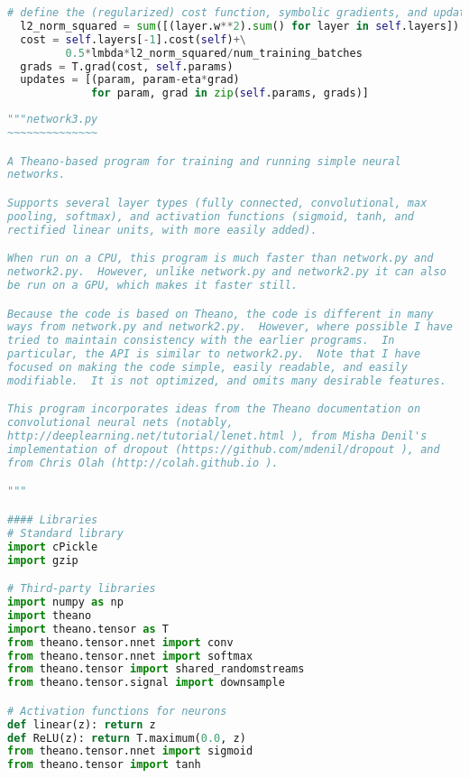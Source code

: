 \begin{lstlisting}[language=Python]
  # define the (regularized) cost function, symbolic gradients, and updates
  l2_norm_squared = sum([(layer.w**2).sum() for layer in self.layers])
  cost = self.layers[-1].cost(self)+\
         0.5*lmbda*l2_norm_squared/num_training_batches
  grads = T.grad(cost, self.params)
  updates = [(param, param-eta*grad) 
             for param, grad in zip(self.params, grads)]
\end{lstlisting}

\begin{lstlisting}[language=Python]
"""network3.py
~~~~~~~~~~~~~~

A Theano-based program for training and running simple neural
networks.

Supports several layer types (fully connected, convolutional, max
pooling, softmax), and activation functions (sigmoid, tanh, and
rectified linear units, with more easily added).

When run on a CPU, this program is much faster than network.py and
network2.py.  However, unlike network.py and network2.py it can also
be run on a GPU, which makes it faster still.

Because the code is based on Theano, the code is different in many
ways from network.py and network2.py.  However, where possible I have
tried to maintain consistency with the earlier programs.  In
particular, the API is similar to network2.py.  Note that I have
focused on making the code simple, easily readable, and easily
modifiable.  It is not optimized, and omits many desirable features.

This program incorporates ideas from the Theano documentation on
convolutional neural nets (notably,
http://deeplearning.net/tutorial/lenet.html ), from Misha Denil's
implementation of dropout (https://github.com/mdenil/dropout ), and
from Chris Olah (http://colah.github.io ).

"""

#### Libraries
# Standard library
import cPickle
import gzip

# Third-party libraries
import numpy as np
import theano
import theano.tensor as T
from theano.tensor.nnet import conv
from theano.tensor.nnet import softmax
from theano.tensor import shared_randomstreams
from theano.tensor.signal import downsample

# Activation functions for neurons
def linear(z): return z
def ReLU(z): return T.maximum(0.0, z)
from theano.tensor.nnet import sigmoid
from theano.tensor import tanh



\end{lstlisting}
